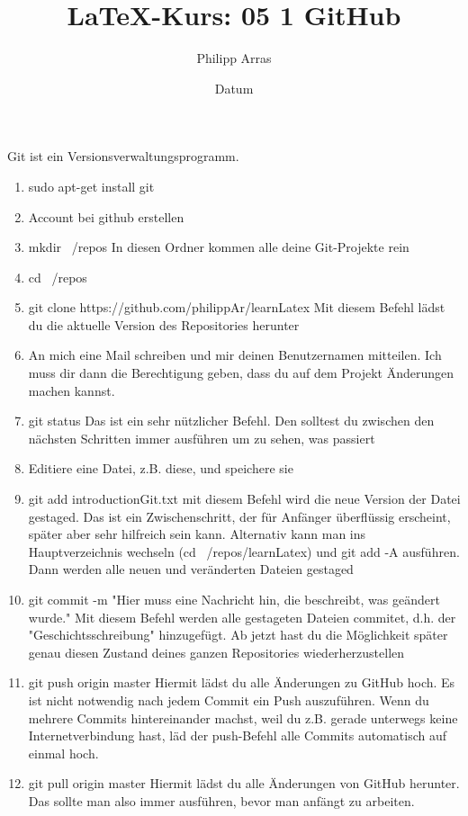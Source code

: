 \documentclass[a4paper,ngerman]{scrartcl} %
\author{Philipp Arras}
\title{\LaTeX -Kurs: 05 1 GitHub}
\date{Datum}
\begin{document}
\maketitle
Git ist ein Versionsverwaltungsprogramm.

\begin{enumerate}
\item sudo apt-get install git
\item Account bei github erstellen
\item mkdir ~/repos
	In diesen Ordner kommen alle deine Git-Projekte rein
\item cd ~/repos
\item git clone https://github.com/philippAr/learnLatex
	Mit diesem Befehl lädst du die aktuelle Version des Repositories herunter
\item An mich eine Mail schreiben und mir deinen Benutzernamen mitteilen. Ich muss dir dann die Berechtigung geben, dass du auf dem Projekt Änderungen machen kannst.
\item git status
	Das ist ein sehr nützlicher Befehl. Den solltest du zwischen den nächsten Schritten immer ausführen um zu sehen, was passiert
\item Editiere eine Datei, z.B. diese, und speichere sie
\item git add introductionGit.txt
	mit diesem Befehl wird die neue Version der Datei gestaged. Das ist ein Zwischenschritt, der für Anfänger überflüssig erscheint, später aber sehr hilfreich sein kann. Alternativ kann man ins Hauptverzeichnis wechseln (cd ~/repos/learnLatex) und git add -A ausführen. Dann werden alle neuen  und veränderten Dateien gestaged
\item git commit -m "Hier muss eine Nachricht hin, die beschreibt, was geändert wurde."
	Mit diesem Befehl werden alle gestageten Dateien commitet, d.h. der "Geschichtsschreibung" hinzugefügt. Ab jetzt hast du die Möglichkeit später genau diesen Zustand deines ganzen Repositories wiederherzustellen
\item git push origin master
	Hiermit lädst du alle Änderungen zu GitHub hoch. Es ist nicht notwendig nach jedem Commit ein Push auszuführen. Wenn du mehrere Commits hintereinander machst, weil du z.B. gerade unterwegs keine Internetverbindung hast, läd der push-Befehl alle Commits automatisch auf einmal hoch.
\item git pull origin master
	Hiermit lädst du alle Änderungen von GitHub herunter. Das sollte man also immer ausführen, bevor man anfängt zu arbeiten.
\end{enumerate}
\end{document}
